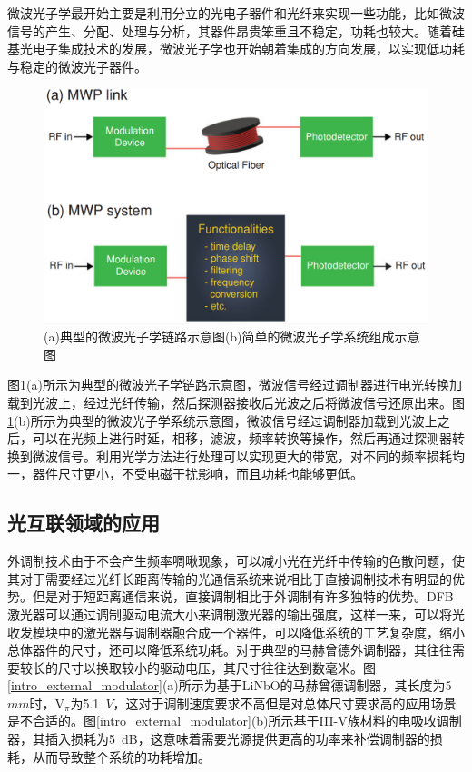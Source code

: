 微波光子学最开始主要是利用分立的光电子器件和光纤来实现一些功能，比如微波信号的产生、分配、处理与分析，其器件昂贵笨重且不稳定，功耗也较大。随着硅基光电子集成技术的发展，微波光子学也开始朝着集成的方向发展，以实现低功耗与稳定的微波光子器件。

\begin{figure}[htb]
	\centering
	\includegraphics[width=14cm]{./Pictures/intro_mwp.png}
	\captionsetup{justification=centering}
	\caption{(a)典型的微波光子学链路示意图(b)简单的微波光子学系统组成示意图\cite{marpaung2013integrated}}
	\label{intro_mwp}
\end{figure}

图\ref{intro_mwp}(a)所示为典型的微波光子学链路示意图，微波信号经过调制器进行电光转换加载到光波上，经过光纤传输，然后探测器接收后光波之后将微波信号还原出来。图\ref{intro_mwp}(b)所示为典型的微波光子学系统示意图，微波信号经过调制器加载到光波上之后，可以在光频上进行时延，相移，滤波，频率转换等操作，然后再通过探测器转换到微波信号。利用光学方法进行处理可以实现更大的带宽，对不同的频率损耗均一，器件尺寸更小，不受电磁干扰影响，而且功耗也能够更低。

\subsection{光互联领域的应用}

外调制技术由于不会产生频率啁啾现象，可以减小光在光纤中传输的色散问题，使其对于需要经过光纤长距离传输的光通信系统来说相比于直接调制技术有明显的优势。但是对于短距离通信来说，直接调制相比于外调制有许多独特的优势。DFB激光器可以通过调制驱动电流大小来调制激光器的输出强度，这样一来，可以将光收发模块中的激光器与调制器融合成一个器件，可以降低系统的工艺复杂度，缩小总体器件的尺寸，还可以降低系统功耗。对于典型的马赫曾德外调制器，其往往需要较长的尺寸以换取较小的驱动电压，其尺寸往往达到数毫米。图\ref{intro_external_modulator}(a)所示为基于LiNbO的马赫曾德调制器，其长度为5~$mm$时，V$_{\pi}$为5.1~$V$，这对于调制速度要求不高但是对总体尺寸要求高的应用场景是不合适的。图\ref{intro_external_modulator}(b)所示基于III-V族材料的电吸收调制器，其插入损耗为5~dB，这意味着需要光源提供更高的功率来补偿调制器的损耗，从而导致整个系统的功耗增加。

